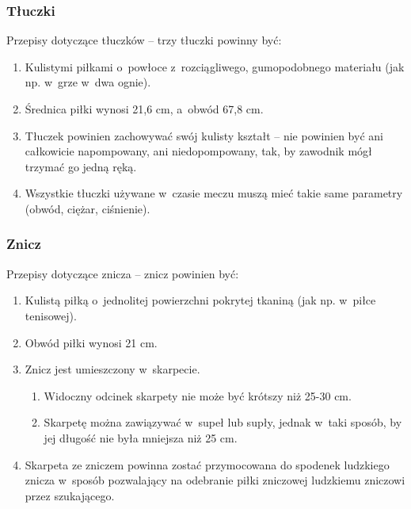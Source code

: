 \documentclass[12pt]{article}
\begin{document}
\subsubsection{Tłuczki}
Przepisy dotyczące tłuczków -- trzy tłuczki powinny być:

\begin{enumerate}
	\item Kulistymi piłkami o~powłoce z~rozciągliwego, gumopodobnego materiału
	      (jak np. w~grze w~dwa ognie).

	\item Średnica piłki wynosi 21,6 cm, a~obwód 67,8 cm.

	\item Tłuczek powinien zachowywać swój kulisty kształt -- nie powinien być
	      ani całkowicie napompowany, ani niedopompowany, tak, by zawodnik mógł
	      trzymać go jedną ręką.

	\item Wszystkie tłuczki używane w~czasie meczu muszą mieć takie same
	      parametry (obwód, ciężar, ciśnienie).
\end{enumerate}

\subsubsection{Znicz}
Przepisy dotyczące znicza -- znicz powinien być:

\begin{enumerate}
	\item Kulistą piłką o~jednolitej powierzchni pokrytej tkaniną (jak np. w~piłce tenisowej).

	\item Obwód piłki wynosi 21 cm.

	\item Znicz jest umieszczony w~skarpecie.
	      \begin{enumerate}
		      \item Widoczny odcinek skarpety nie może być krótszy niż 25-30 cm.

		      \item Skarpetę można zawiązywać w~supeł lub supły, jednak w~taki sposób,
		            by jej długość nie była mniejsza niż 25 cm.
	      \end{enumerate}
	\item Skarpeta ze zniczem powinna zostać przymocowana do spodenek ludzkiego
	      znicza w~sposób pozwalający na odebranie piłki zniczowej ludzkiemu
	      zniczowi przez szukającego.
\end{enumerate}
\end{document}
